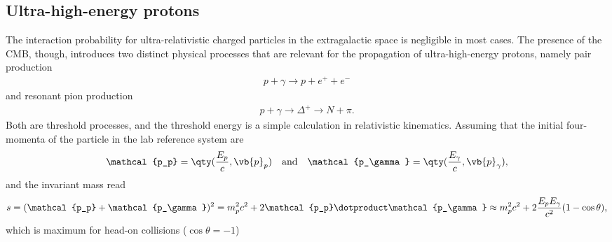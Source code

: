 \subsection{Ultra-high-energy protons}\label{sec:universe_transparency}

The interaction probability for ultra-relativistic charged particles in the extragalactic
space is negligible in most cases. The presence of the CMB, though, introduces
two distinct physical processes that are relevant for the propagation of ultra-high-energy
protons, namely pair production
\begin{align*}
  p + \gamma \rightarrow p + e^+ + e^-
\end{align*}
and resonant pion production
\begin{align*}
  p + \gamma \rightarrow \Delta^+ \rightarrow N + \pi.
\end{align*}
Both are threshold processes, and the threshold energy is a simple calculation in
relativistic kinematics. Assuming that the initial four-momenta of the particle in
the lab reference system are
\begin{align*}
  \mathcal{p_p} = \qty(\frac{E_p}{c}, \vb{p}_p)
  \quad\text{and}\quad
  \mathcal{p_\gamma} = \qty(\frac{E_\gamma}{c}, \vb{p}_\gamma),
\end{align*}
and the invariant mass read
\begin{align*}
  s = (\mathcal{p_p} + \mathcal{p_\gamma})^2 =
  m_p^2 c^2 + 2 \mathcal{p_p} \dotproduct \mathcal{p_\gamma} \approx
  m_p^2 c^2 + 2 \frac{E_p E_\gamma}{c^2} (1 - \cos\theta),
\end{align*}
which is maximum for head-on collisions ($\cos\theta = -1$)
